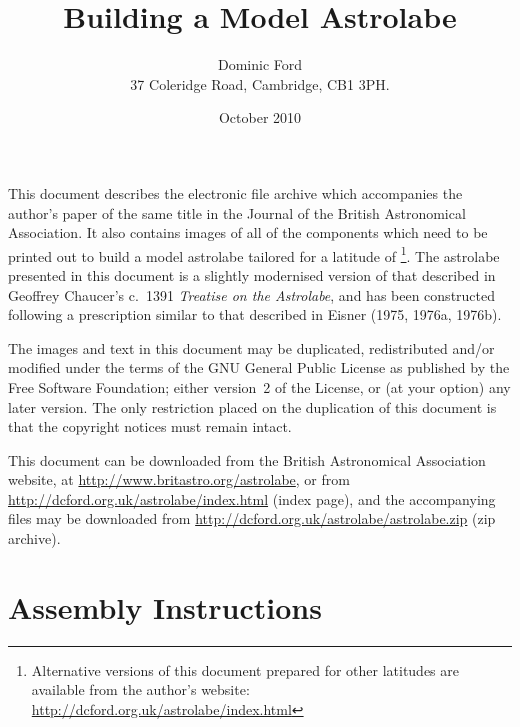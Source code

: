 \documentclass[a4paper,onecolumn,10pt]{article}
\title{Building a Model Astrolabe}
\author{Dominic Ford \\ 37 Coleridge Road, Cambridge, CB1 3PH.}
\date{October 2010}
\begin{document}
\maketitle
\setcounter{footnote}{1}

This document describes the electronic file archive which accompanies the
author's paper of the same title in the Journal of the British Astronomical
Association.  It also contains images of all of the components which need to be
printed out to build a model astrolabe tailored for a latitude of
\footnote{Alternative versions of this document prepared for
other latitudes are available from the author's website:
\url{http://dcford.org.uk/astrolabe/index.html}}.  The astrolabe presented in
this document is a slightly modernised version of that described in Geoffrey
Chaucer's c.\ 1391 {\it Treatise on the Astrolabe}, and has been constructed
following a prescription similar to that described in Eisner (1975, 1976a,
1976b).

The images and text in this document may be duplicated, redistributed and/or
modified under the terms of the GNU General Public License as published by the
Free Software Foundation; either version~2 of the License, or (at your option)
any later version. The only restriction placed on the duplication of this
document is that the copyright notices must remain intact.

This document can be downloaded from the British Astronomical Association
website, at
\vspace{1mm}\newline\noindent
\url{http://www.britastro.org/astrolabe},
or from
\vspace{1mm}\newline\noindent
\url{http://dcford.org.uk/astrolabe/index.html} (index page),
\vspace{1mm}\newline\noindent
and the accompanying files may be downloaded from
\vspace{1mm}\newline\noindent
\url{http://dcford.org.uk/astrolabe/astrolabe.zip} (zip archive).

\section*{Assembly Instructions}
\end{document}
